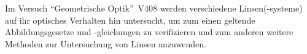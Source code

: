 Im Versuch \textquotedblleft Geometrische Optik\textquotedblright \, V408 werden verschiedene Linsen(-systeme) auf ihr optisches Verhalten hin untersucht, um zum einen geltende Abbildungsgesetze und -gleichungen zu verifizieren
und zum anderen weitere Methoden zur Untersuchung von Linsen anzuwenden.  
